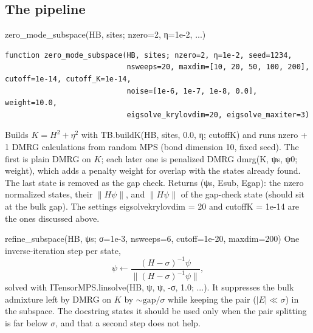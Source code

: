 \documentclass[11pt]{article}
\newcommand{\codeus}{\textunderscore\allowbreak}
\renewcommand{\code}[1]{{\ttfamily\let\_\codeus #1}}
\begin{document}
\subsection{The pipeline}

\begin{function}{zero\_mode\_subspace(HB, sites; nzero=2, η=1e-2, ...)}
\begin{Verbatim}
function zero_mode_subspace(HB, sites; nzero=2, η=1e-2, seed=1234,
                            nsweeps=20, maxdim=[10, 20, 50, 100, 200], cutoff=1e-14, cutoff_K=1e-14,
                            noise=[1e-6, 1e-7, 1e-8, 0.0], weight=10.0,
                            eigsolve_krylovdim=20, eigsolve_maxiter=3)
\end{Verbatim}
Builds $K=H^2+\eta^2$ with \code{TB.build\_K(HB, sites, 0.0, η; cutoff\_K)} and runs \code{nzero + 1} DMRG calculations from random MPS (bond dimension 10, fixed \code{seed}). The first is plain DMRG on $K$; each later one is penalized DMRG \code{dmrg(K, ψs, ψ0; weight)}, which adds a penalty \code{weight} for overlap with the states already found. The last state is removed as the gap check. Returns \code{(ψs, E\_sub, E\_gap)}: the \code{nzero} normalized states, their $\|H\psi\|$, and $\|H\psi\|$ of the gap-check state (should sit at the bulk gap). The settings \code{eigsolve\_krylovdim = 20} and \code{cutoff\_K = 1e-14} are the ones discussed above.
\end{function}

\begin{function}{refine\_subspace(HB, ψs; σ=1e-3, nsweeps=6, cutoff=1e-20, maxdim=200)}
One inverse-iteration step per state,
\[
\psi\leftarrow\frac{(H-\sigma)^{-1}\psi}{\|(H-\sigma)^{-1}\psi\|},
\]
solved with \code{ITensorMPS.linsolve(HB, ψ, ψ, -σ, 1.0; ...)}. It suppresses the bulk admixture left by DMRG on $K$ by $\sim\text{gap}/\sigma$ while keeping the pair ($|E|\ll\sigma$) in the subspace. The docstring states it should be used only when the pair splitting is far below $\sigma$, and that a second step does not help.
\end{function}
\end{document}
